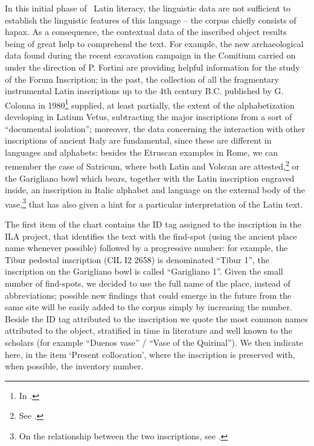 \documentclass[amsthm,ebook]{saparticle}
\begin{document}
In this initial phase of \ Latin literacy, the linguistic data are not sufficient to establish the linguistic features
of this language – the corpus chiefly consists of hapax. As a consequence, the contextual data of the inscribed object
results being of great help to comprehend the text. For example, the new archaeological data found during the recent
excavation campaign in the Comitium carried on under the direction of P. Fortini are providing helpful information for
the study of the Forum Inscription; in the past, the collection of all the fragmentary instrumental Latin inscriptions
up to the 4th century B.C. published by G. Colonna in 1980\footnote{In \citet{stibbe_lapis_1980}.} supplied, at least
partially, the extent of the alphabetization developing in Latium Vetus, subtracting the major inscriptions from a sort
of “documental isolation”; moreover, the data concerning the interaction with other inscriptions of ancient Italy are
fundamental, since these are different in languages and alphabets: besides the Etruscan examples in Rome, we can
remember the case of Satricum, where both Latin and Volscan are attested,\footnote{See \citet[189-198]{rocca_i_1995}.} or the
Garigliano bowl which bears, together with the Latin inscription engraved inside, an inscription in Italic alphabet and
language on the external body of the vase,\footnote{On the relationship between the two inscriptions, see \citet{antonini_osservazioni_2012}.} that has also given a hint for a particular interpretation of the Latin text. 

The first item of the chart contains the ID tag assigned to the inscription in the ILA project, that identifies the text
with the find-spot (using the ancient place name whenever possible) followed by a progressive number: for example, the
Tibur pedestal inscription (CIL I2 2658) is denominated “Tibur 1”, the inscription on the Garigliano bowl is called
“Garigliano 1”. Given the small number of find-spots, we decided to use the full name of the place, instead of
abbreviations; possible new findings that could emerge in the future from the same site will be easily added to the
corpus simply by increasing the number. Beside the ID tag attributed to the inscription we quote the most common names
attributed to the object, stratified in time in literature and well known to the scholars (for example “Duenos vase” /
“Vase of the Quirinal”). We then indicate here, in the item `Present collocation', where the inscription is
preserved with, when possible, the inventory number.
\end{document}
